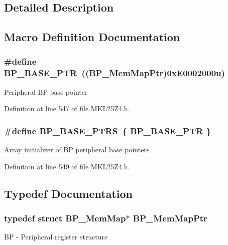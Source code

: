 \subsection{Detailed Description}


\subsection{Macro Definition Documentation}
\subsubsection[{\texorpdfstring{B\+P\+\_\+\+B\+A\+S\+E\+\_\+\+P\+TR}{BP_BASE_PTR}}]{\setlength{\rightskip}{0pt plus 5cm}\#define B\+P\+\_\+\+B\+A\+S\+E\+\_\+\+P\+TR~(({\bf B\+P\+\_\+\+Mem\+Map\+Ptr})0x\+E0002000u)}\hypertarget{group___b_p___peripheral_ga375cd6d2e7ec414f4e33cb54d5494940}{}\label{group___b_p___peripheral_ga375cd6d2e7ec414f4e33cb54d5494940}
Peripheral BP base pointer 

Definition at line 547 of file M\+K\+L25\+Z4.\+h.

\subsubsection[{\texorpdfstring{B\+P\+\_\+\+B\+A\+S\+E\+\_\+\+P\+T\+RS}{BP_BASE_PTRS}}]{\setlength{\rightskip}{0pt plus 5cm}\#define B\+P\+\_\+\+B\+A\+S\+E\+\_\+\+P\+T\+RS~\{ {\bf B\+P\+\_\+\+B\+A\+S\+E\+\_\+\+P\+TR} \}}\hypertarget{group___b_p___peripheral_ga6c07114ad41ccb42b134e8834f123598}{}\label{group___b_p___peripheral_ga6c07114ad41ccb42b134e8834f123598}
Array initializer of BP peripheral base pointers 

Definition at line 549 of file M\+K\+L25\+Z4.\+h.



\subsection{Typedef Documentation}
\subsubsection[{\texorpdfstring{B\+P\+\_\+\+Mem\+Map\+Ptr}{BP_MemMapPtr}}]{\setlength{\rightskip}{0pt plus 5cm}typedef struct {\bf B\+P\+\_\+\+Mem\+Map}$\ast$ {\bf B\+P\+\_\+\+Mem\+Map\+Ptr}}\hypertarget{group___b_p___peripheral_gaa250950ffe336f8c6e5895e3a1e4ca86}{}\label{group___b_p___peripheral_gaa250950ffe336f8c6e5895e3a1e4ca86}
BP -\/ Peripheral register structure 
